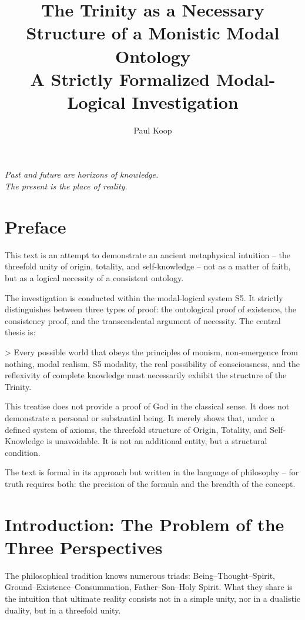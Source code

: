 \documentclass[
]{article}
\title{The Trinity as a Necessary Structure of a Monistic Modal Ontology \\ \large A Strictly Formalized Modal-Logical Investigation}
\author{Paul Koop}
\date{}
\begin{document}
\maketitle

\begin{center}
\emph{Past and future are horizons of knowledge. \\ The present is the place of reality.}
\end{center}

\newpage
{
\setcounter{tocdepth}{3}
\tableofcontents
}
\newpage

\section{Preface}\label{preface}

This text is an attempt to demonstrate an ancient metaphysical intuition -- the threefold unity of origin, totality, and self-knowledge -- not as a matter of faith, but as a logical necessity of a consistent ontology.

The investigation is conducted within the modal-logical system S5. It strictly distinguishes between three types of proof: the ontological proof of existence, the consistency proof, and the transcendental argument of necessity. The central thesis is:

> Every possible world that obeys the principles of monism, non-emergence from nothing, modal realism, S5 modality, the real possibility of consciousness, and the reflexivity of complete knowledge must necessarily exhibit the structure of the Trinity.

This treatise does not provide a proof of God in the classical sense. It does not demonstrate a personal or substantial being. It merely shows that, under a defined system of axioms, the threefold structure of Origin, Totality, and Self-Knowledge is unavoidable. It is not an additional entity, but a structural condition.

The text is formal in its approach but written in the language of philosophy -- for truth requires both: the precision of the formula and the breadth of the concept.

\section{Introduction: The Problem of the Three Perspectives}\label{introduction-the-problem-of-the-three-perspectives}

The philosophical tradition knows numerous triads: Being--Thought--Spirit, Ground--Existence--Consummation, Father--Son--Holy Spirit. What they share is the intuition that ultimate reality consists not in a simple unity, nor in a dualistic duality, but in a threefold unity.
\end{document}
